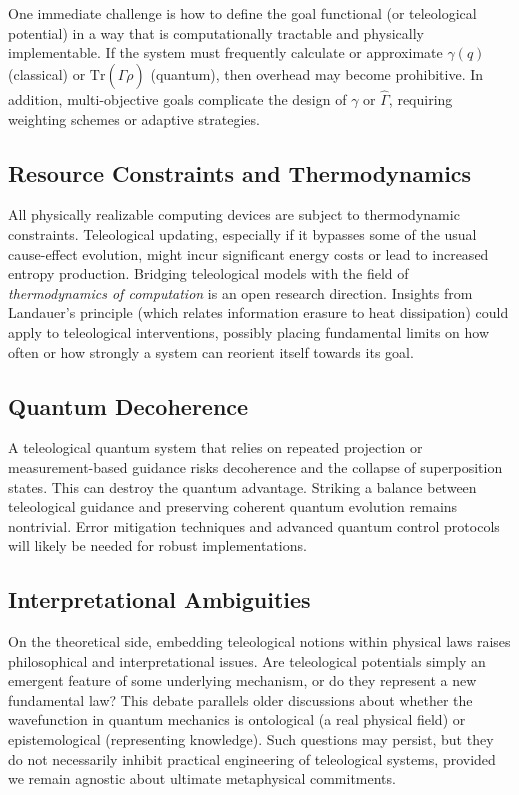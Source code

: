 \documentclass[12pt]{article}
\begin{document}
One immediate challenge is how to define the goal functional (or teleological potential) in a way that is computationally tractable and physically implementable. If the system must frequently calculate or approximate $\gamma(q)$ (classical) or $\mathrm{Tr}(\hat{\Gamma}\rho)$ (quantum), then overhead may become prohibitive. In addition, multi-objective goals complicate the design of $\gamma$ or $\hat{\Gamma}$, requiring weighting schemes or adaptive strategies.

\subsection{Resource Constraints and Thermodynamics}

All physically realizable computing devices are subject to thermodynamic constraints. Teleological updating, especially if it bypasses some of the usual cause-effect evolution, might incur significant energy costs or lead to increased entropy production. Bridging teleological models with the field of \emph{thermodynamics of computation} is an open research direction. Insights from Landauer's principle (which relates information erasure to heat dissipation) could apply to teleological interventions, possibly placing fundamental limits on how often or how strongly a system can reorient itself towards its goal.

\subsection{Quantum Decoherence}

A teleological quantum system that relies on repeated projection or measurement-based guidance risks decoherence and the collapse of superposition states. This can destroy the quantum advantage. Striking a balance between teleological guidance and preserving coherent quantum evolution remains nontrivial. Error mitigation techniques and advanced quantum control protocols will likely be needed for robust implementations.

\subsection{Interpretational Ambiguities}

On the theoretical side, embedding teleological notions within physical laws raises philosophical and interpretational issues. Are teleological potentials simply an emergent feature of some underlying mechanism, or do they represent a new fundamental law? This debate parallels older discussions about whether the wavefunction in quantum mechanics is ontological (a real physical field) or epistemological (representing knowledge). Such questions may persist, but they do not necessarily inhibit practical engineering of teleological systems, provided we remain agnostic about ultimate metaphysical commitments.
\end{document}
